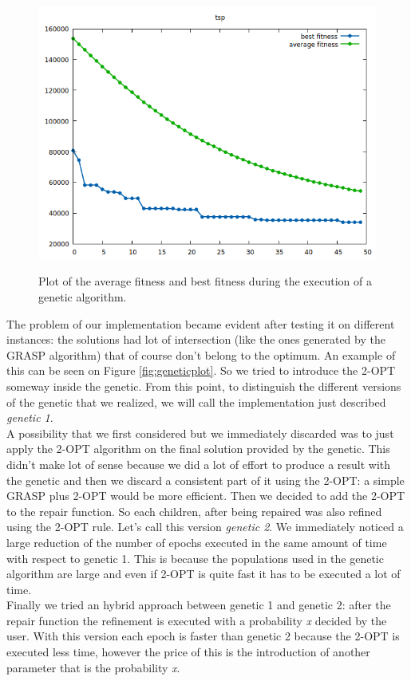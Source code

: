 \begin{figure}[h!]
\centering
	\includegraphics[scale=0.6]{media/fitnessPlot.png} \\
	\caption{Plot of the average fitness and best fitness during the execution of a genetic algorithm.}
	\label{fig:fitness}
\end{figure}

\noindent The problem of our implementation became evident after testing it on different instances: the solutions had lot of intersection (like the ones generated by the GRASP algorithm) that of course don't belong to the optimum. An example of this can be seen on Figure \ref{fig:geneticplot}. So we tried to introduce the 2-OPT someway inside the genetic. From this point, to distinguish the different versions of the genetic that we realized, we will call the implementation just described \textit{genetic 1}. \\
A possibility that we first considered but we immediately discarded was to just apply the 2-OPT algorithm on the final solution provided by the genetic. This didn't make lot of sense because we did a lot of effort to produce a result with the genetic and then we discard a consistent part of it using the 2-OPT: a simple GRASP plus 2-OPT would be more efficient.
Then we decided to add the 2-OPT to the repair function. So each children, after being repaired was also refined using the 2-OPT rule. Let's call this version \textit{genetic 2}. We immediately noticed a large reduction of the number of epochs executed in the same amount of time with respect to genetic 1. This is because the populations used in the genetic algorithm are large and even if 2-OPT is quite fast it has to be executed a lot of time. \\
Finally we tried an hybrid approach between genetic 1 and genetic 2: after the repair function the refinement is executed with a probability \textit{x} decided by the user. With this version each epoch is faster than genetic 2 because the 2-OPT is executed less time, however the price of this is the introduction of another parameter that is the probability \textit{x}.\\

